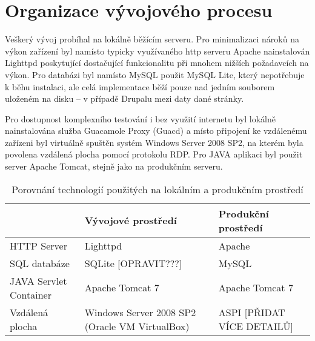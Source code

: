 \chapter{Organizace vývojového procesu}
\label{chap:vyvoj}

Veškerý vývoj probíhal na lokálně běžícím serveru. Pro minimalizaci nároků na výkon zařízení byl namísto typicky využívaného http serveru Apache nainstalován Lighttpd poskytující dostačující funkcionalitu při mnohem nižších požadavcích na výkon. Pro databázi byl namísto MySQL použit MySQL Lite, který nepotřebuje k běhu instalaci, ale celá implementace běží pouze nad jedním souborem uloženém na disku – v případě Drupalu mezi daty dané stránky. 

Pro dostupnost komplexního testování i bez využití internetu byl lokálně nainstalována služba Guacamole Proxy (Guacd) a místo připojení ke vzdálenému zařízeni byl virtuálně spuštěn systém Windows Server 2008 SP2, na kterém byla povolena vzdálená plocha pomocí protokolu RDP. Pro JAVA aplikaci byl použit server Apache Tomcat, stejně jako na produkčním serveru.

\begin{table}
  \caption{Porovnání technologií použitých na lokálním a produkčním prostředí}
  \begin{tabular}{ | p{3cm} | p{4cm} | p{4cm} | }
    \hline  
    & Vývojové prostředí & Produkční prostředí \\ \hline
    HTTP Server & Lighttpd & Apache \\ \hline
    SQL databáze & SQLite [OPRAVIT???] & MySQL \\ \hline
    JAVA Servlet Container & Apache Tomcat 7 & Apache Tomcat 7 \\ \hline
    Vzdálená plocha & Windows Server 2008 SP2 (Oracle VM VirtualBox) & ASPI [PŘIDAT VÍCE DETAILŮ] \\ \hline
  \end{tabular}
\end{table}

